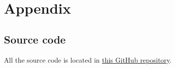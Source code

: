 \documentclass[../main.tex]{subfiles}
\begin{document}
\section{Appendix}
\subsection{Source code}
All the source code is located in \href{https://github.com/kmaasrud/ffnn-fys-stk4155}{this GitHub repository}.
\end{document}
